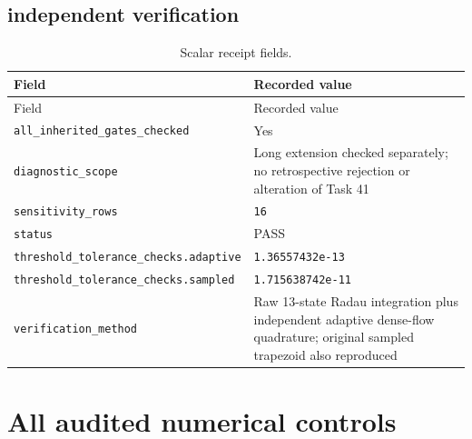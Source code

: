 
\subsection*{independent verification}

\begingroup\scriptsize
\setlength{\tabcolsep}{3pt}
\begin{longtable}{p{.46\linewidth}p{.46\linewidth}}
\caption{Scalar receipt fields.}\\
\toprule
Field & Recorded value \\
\midrule\endfirsthead
\toprule
Field & Recorded value \\
\midrule\endhead
\bottomrule\endfoot
\nolinkurl{all_inherited_gates_checked} & Yes \\
\nolinkurl{diagnostic_scope} & Long extension checked separately; no retrospective rejection or alteration of Task 41 \\
\nolinkurl{sensitivity_rows} & \texttt{16} \\
\nolinkurl{status} & PASS \\
\nolinkurl{threshold_tolerance_checks.adaptive} & \texttt{1.36557432e-13} \\
\nolinkurl{threshold_tolerance_checks.sampled} & \texttt{1.715638742e-11} \\
\nolinkurl{verification_method} & Raw 13-state Radau integration plus independent adaptive dense-flow quadrature; original sampled trapezoid also reproduced \\
\end{longtable}
\endgroup



\section{All audited numerical controls}

